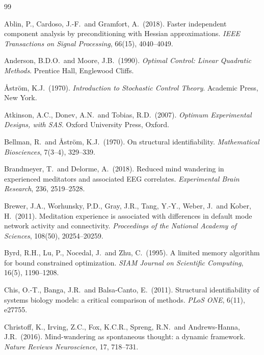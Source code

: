 \documentclass[12pt,a4paper]{article}
\theoremstyle{plain}
\theoremstyle{definition}
\theoremstyle{remark}
\begin{document}
\begin{thebibliography}{99}
\small

Ablin, P., Cardoso, J.-F.\ and Gramfort, A.\ (2018).
Faster independent component analysis by preconditioning with Hessian approximations.
\textit{IEEE Transactions on Signal Processing}, 66(15), 4040--4049.

Anderson, B.D.O.\ and Moore, J.B.\ (1990).
\textit{Optimal Control: Linear Quadratic Methods}. Prentice Hall, Englewood Cliffs.

\AA{}str\"om, K.J.\ (1970).
\textit{Introduction to Stochastic Control Theory}. Academic Press, New York.

Atkinson, A.C., Donev, A.N.\ and Tobias, R.D.\ (2007).
\textit{Optimum Experimental Designs, with SAS}. Oxford University Press, Oxford.

Bellman, R.\ and \AA{}str\"om, K.J.\ (1970).
On structural identifiability.
\textit{Mathematical Biosciences}, 7(3--4), 329--339.

Brandmeyer, T.\ and Delorme, A.\ (2018).
Reduced mind wandering in experienced meditators and associated EEG correlates.
\textit{Experimental Brain Research}, 236, 2519--2528.

Brewer, J.A., Worhunsky, P.D., Gray, J.R., Tang, Y.-Y., Weber, J.\ and Kober, H.\ (2011).
Meditation experience is associated with differences in default mode network activity and connectivity.
\textit{Proceedings of the National Academy of Sciences}, 108(50), 20254--20259.

Byrd, R.H., Lu, P., Nocedal, J.\ and Zhu, C.\ (1995).
A limited memory algorithm for bound constrained optimization.
\textit{SIAM Journal on Scientific Computing}, 16(5), 1190--1208.

Chis, O.-T., Banga, J.R.\ and Balsa-Canto, E.\ (2011).
Structural identifiability of systems biology models: a critical comparison of methods.
\textit{PLoS ONE}, 6(11), e27755.

Christoff, K., Irving, Z.C., Fox, K.C.R., Spreng, R.N.\ and Andrews-Hanna, J.R.\ (2016).
Mind-wandering as spontaneous thought: a dynamic framework.
\textit{Nature Reviews Neuroscience}, 17, 718--731.


\end{thebibliography}
\end{document}
